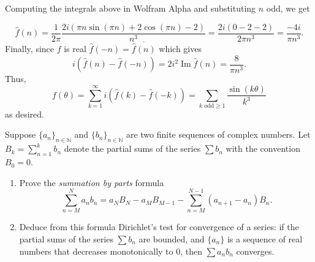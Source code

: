 \documentclass[12 pt, letterpaper]{hmcpset}
\begin{document}
\begin{solution}
\begin{enumerate}
			Computing the integrals above in Wolfram Alpha and substituting $n$ odd, we get

			\[
				\hat{f}(n) = \frac{1}{2 \pi} \frac{2 i (\pi n \sin{(\pi n)} + 2 \cos{(\pi n)} - 2)}{n^{3}} = \frac{2i(0 - 2 - 2)}{2 \pi n^{3}} = \frac{-4 i}{\pi n^{3}}.
			\]
			Finally, since $f$ is real $\hat{f}(-n) = \overline{\hat{f}(n)}$ which gives
			\[
				i(\hat{f}(n) - \hat{f}(-n)) = 2 i^{2} \operatorname{Im} \hat{f}(n) = \frac{8}{\pi n^{3}}.
			\]
			Thus,
			\[
				f(\theta) = \sum_{k = 1}^{\infty} i(\hat{f}(k) - \hat{f}(-k)) = \sum_{k \text{ odd} \ge 1} \frac{\sin{(k \theta)}}{k^{3}}
			\]
			as desired.
	\end{enumerate}
\end{solution}

\pagebreak

\begin{problem}[S \& S \S 2.6 \#7.]
	Suppose $\{ a_{n} \}_{n \in \mathbb{N}}$ and $\{ b_{n} \}_{n \in \mathbb{N}}$ are two finite sequences of complex numbers. Let $B_{k} = \sum_{n = 1}^{k} b_{n}$ denote the partial sums of the series $\sum b_{n}$ with the convention $B_{0} = 0$.
	\begin{enumerate}
		\item Prove the \emph{summation by parts} formula
			\[
				\sum_{n = M}^{N} a_{n} b_{n} = a_{N} B_{N} - a_{M} B_{M - 1} - \sum_{n = M}^{N - 1} (a_{n + 1} - a_{n}) B_{n}.
			\]
		\item Deduce from this formula Dirichlet's test for convergence of a series: if the partial sums of the series $\sum b_{n}$ are bounded, and $\{ a_{n} \}$ is a sequence of real numbers that decreases monotonically to $0$, then $\sum a_{n} b_{n}$ converges.
	\end{enumerate}
\end{problem}
\end{document}
